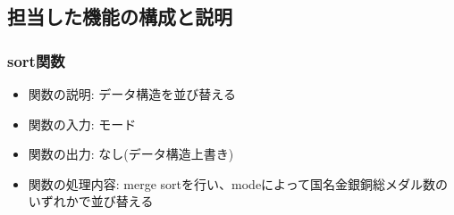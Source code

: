\documentclass[a4paper,11pt]{jsarticle}
\begin{document}
\subsection*{担当した機能の構成と説明}

\subsubsection*{sort関数}
\begin{itemize}
    \item 関数の説明: データ構造を並び替える
    \item 関数の入力: モード
    \item 関数の出力: なし(データ構造上書き)
    \item 関数の処理内容: merge sortを行い、modeによって国名金銀銅総メダル数のいずれかで並び替える
\end{itemize}
\end{document}
